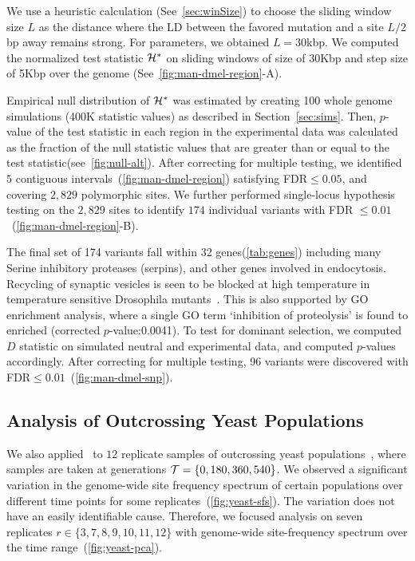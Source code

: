 We use a heuristic calculation (See~\ref{sec:winSize}) to choose the
sliding window size $L$ as the distance where the LD between the
favored mutation and a site $L/2$bp away remains strong. For \dmel
parameters, we obtained $L=30$kbp. We computed the normalized test
statistic ${\cal H}^*$ on sliding windows of size of 30Kbp and step size of
5Kbp over the genome (See~\ref{fig:man-dmel-region}-A).

Empirical null distribution of ${\cal H}^*$ was estimated by creating 100
whole genome simulations (400K statistic values) as described in
Section~\ref{sec:sims}. Then, $p$-value of the test statistic in each
region in the experimental data was calculated as the fraction of the
null statistic values that are greater than or equal to the test
statistic(see~\ref{fig:null-alt}).  After correcting for multiple
testing, we identified $5$ contiguous
intervals~(\ref{fig:man-dmel-region}) satisfying FDR$\le0.05$, and
covering $2,829$ polymorphic sites. We further performed single-locus
hypothesis testing on the $2,829$ sites to identify $174$ individual
variants with FDR $\le0.01$~(\ref{fig:man-dmel-region}-B).

The final set of 174 variants fall within 32 genes(\ref{tab:genes})
including many Serine inhibitory proteases (serpins), and other genes
involved in endocytosis. Recycling of synaptic vesicles is seen to be
blocked at high temperature in temperature sensitive Drosophila
mutants~\cite{kosaka1983reversible}. This is also supported by GO
enrichment analysis, where a single GO term `inhibition of
proteolysis' is found to enriched (corrected $p$-value:0.0041).  To
test for dominant selection, we computed $D$ statistic on simulated
neutral and experimental data, and computed $p$-values accordingly.
After correcting for multiple testing, 96 variants were discovered
with FDR$\le 0.01$~(\ref{fig:man-dmel-snp}). 


\subsection{Analysis of Outcrossing Yeast Populations}
We also applied \comale\ to  $12$ replicate samples of
outcrossing yeast populations~\cite{burke2014standing}, where samples are 
taken at
generations ${\cal T}=\{0,180,360,540\}$. We observed a significant
variation in the genome-wide site frequency spectrum of certain
populations over different time points for some
replicates~(\ref{fig:yeast-sfs}). The variation does not have an
easily identifiable cause. Therefore, we focused analysis on seven
replicates $r\in\{3,7,8,9,10,11,12\}$ with genome-wide site-frequency
spectrum over the time range~(\ref{fig:yeast-pca}).

